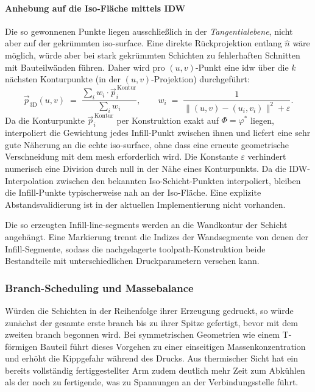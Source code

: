                 \paragraph{Anhebung auf die Iso-Fläche mittels IDW}
                    Die so gewonnenen Punkte liegen ausschließlich in der \emph{Tangentialebene}, nicht aber auf der gekrümmten \gls{iso-surface}.
                    Eine direkte Rückprojektion entlang $\hat{n}$ wäre möglich, würde aber bei stark gekrümmten Schichten zu fehlerhaften Schnitten mit Bauteilwänden führen.
                    Daher wird pro $(u, v)$-Punkt eine \gls{idw} über die $k$ nächsten Konturpunkte (in der $(u,v)$-Projektion) durchgeführt: 
                    \begin{equation}
                        \vec{p}_\text{3D}(u, v) \;=\; \frac{\sum_i w_i \cdot \vec{p}_i^{\,\text{Kontur}}}{\sum_i w_i},
                        \qquad
                        w_i \;=\; \frac{1}{\lVert(u,v) - (u_i, v_i)\rVert^2 + \varepsilon}.
                        \label{eq:concept-crystal-idw}
                    \end{equation}
                    Da die Konturpunkte $\vec{p}_i^{\,\text{Kontur}}$ per Konstruktion exakt auf $\Phi = \varphi^*$ liegen, interpoliert die Gewichtung jedes Infill-Punkt zwischen ihnen und liefert eine sehr gute Näherung an die echte \gls{iso-surface}, ohne dass eine erneute geometrische Verschneidung mit dem \gls{mesh} erforderlich wird.
                    Die Konstante $\varepsilon$ verhindert numerisch eine Division durch null in der Nähe eines Konturpunkts.
                    Da die IDW-Interpolation zwischen den bekannten Iso-Schicht-Punkten interpoliert, bleiben die Infill-Punkte typischerweise nah an der Iso-Fläche.
                    Eine explizite Abstandsvalidierung ist in der aktuellen Implementierung nicht vorhanden.

                    Die so erzeugten Infill-\glspl{line-segment} werden an die Wandkontur der Schicht angehängt.
                    Eine Markierung trennt die Indizes der Wandsegmente von denen der Infill-Segmente, sodass die nachgelagerte \gls{toolpath}-Konstruktion beide Bestandteile mit unterschiedlichen Druckparametern versehen kann.

            \subsubsection{Branch-Scheduling und Massebalance}\label{subsubsec:concept-crystal-branch-scheduling} 
                Würden die Schichten in der Reihenfolge ihrer Erzeugung gedruckt, so würde zunächst der gesamte erste \gls{branch} bis zu ihrer Spitze gefertigt, bevor mit dem zweiten \gls{branch} begonnen wird.
                Bei symmetrischen Geometrien wie einem T-förmigen Bauteil führt dieses Vorgehen zu einer einseitigen Massenkonzentration und erhöht die Kippgefahr während des Drucks.
                Aus thermischer Sicht hat ein bereits vollständig fertiggestellter Arm zudem deutlich mehr Zeit zum Abkühlen als der noch zu fertigende, was zu Spannungen an der Verbindungsstelle führt.

